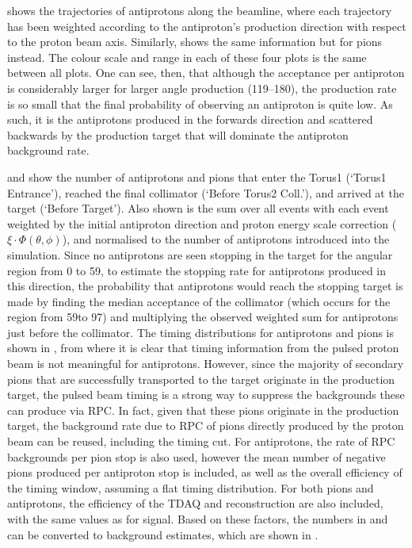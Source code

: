  shows the trajectories of antiprotons along the beamline, where each trajectory has been weighted according to the antiproton's production direction with respect to the proton beam axis.
Similarly,  shows the same information but for pions instead.
The colour scale and range in each of these four plots is the same between all plots.  
One can see, then, that although the acceptance per antiproton is considerably larger for larger angle production (119--180\degree), the production rate is so small that the final probability of observing an antiproton is quite low.
As such, it is the antiprotons produced in the forwards direction and scattered backwards by the production target that will dominate the antiproton background rate.

 and  show the number of antiprotons and pions that enter the Torus1 (`Torus1 Entrance'), reached the final collimator (`Before Torus2 Coll.'), and arrived at the target (`Before Target').
Also shown is the sum over all events with each event weighted by the initial antiproton direction and proton energy scale correction ($\xi\cdot\Phi(\theta,\phi)$), and normalised to the number of antiprotons introduced into the simulation.
Since no antiprotons are seen stopping in the target for the angular region from 0 to 59\degree, to estimate the stopping rate for antiprotons produced in this direction, 
the probability that antiprotons would reach the stopping target is made by finding the median acceptance of the collimator (which occurs for the region from 59\degree to 97\degree) and multiplying the observed weighted sum for antiprotons just before the collimator.
The timing distributions for antiprotons and pions is shown in , from where it is clear that timing information from the pulsed proton beam is not meaningful for antiprotons.
However, since the majority of secondary pions that are successfully transported to the target originate in the production target, the pulsed beam timing is a strong way to suppress the backgrounds these can produce via \ac{RPC}.
In fact, given that these pions originate in the production target, the background rate due to RPC of pions directly produced by the proton beam can be reused, including the timing cut.
For antiprotons, the rate of RPC backgrounds per pion stop is also used, however the mean number of negative pions produced per antiproton stop is included, as well as the overall efficiency of the timing window, assuming a flat timing distribution.
For both pions and antiprotons, the efficiency of the TDAQ and reconstruction are also included, with the same values as for signal.
Based on these factors, the numbers in  and  can be converted to background estimates, which are shown in .
\FigAntiprotonSimTime
\TabAntiprotonEstimates

